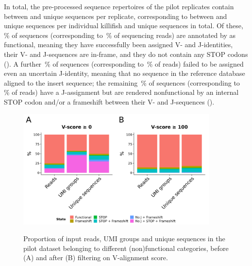 In total, the pre-processed sequence repertoires of the pilot replicates contain between  and  unique sequences per replicate, corresponding to between  and  unique sequences per individual killifish and  unique sequences in total. Of these, \,\% of sequences (corresponding to \,\% of sequencing reads) are annotated by  as functional, meaning they have successfully been assigned V- and J-identities, their V- and J-sequences are in-frame, and they do not contain any STOP codons (). A further \,\% of sequences (corresponding to \,\% of reads) failed to be assigned even an uncertain J-identity, meaning that no \jh sequence in the reference database aligned to the insert sequence; the remaining \,\% of sequences (corresponding to \,\% of reads) have a J-assignment but are rendered nonfunctional by an internal STOP codon and/or a frameshift between their V- and J-sequences ().

\begin{figure}
\centering
\includegraphics[width = 0.9\textwidth]{_Figures/png/pilot-functional-prop}
\begin{subfigure}{0em}
\label{fig:igseq-pilot-functional-prop-a}
\end{subfigure}
\begin{subfigure}{0em}
\label{fig:igseq-pilot-functional-prop-b}
\end{subfigure}
\caption{Proportion of input reads, UMI groups and unique sequences in the pilot \igseq dataset belonging to different (non)functional categories, before (A) and after (B) filtering on V-alignment score.}
\label{fig:igseq-pilot-functional-prop}
\end{figure}

